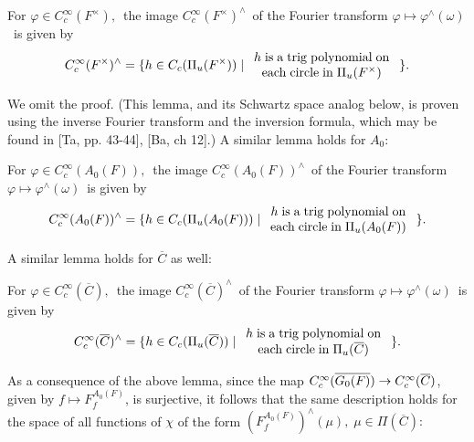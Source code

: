 \begin{lemma}
For $\varphi \in C_c^\infty (F^{\times }),$\ the image $C_c^\infty
(F^{\times })^{\wedge }$\ of the Fourier transform $\varphi \longmapsto
\varphi ^{\wedge }(\omega )$\ is given by 
\[
C_c^\infty (F^{\times })^{\wedge }=\{h\in C_c(\Pi _u(F^{\times }))\;|\;
\begin{array}{c}
h\;{\rm is\;a\;trig\;polynomial\;on} \\ 
{\rm each\;circle\;in}\;\Pi _u(F^{\times })
\end{array}
\;\}.
\]
\end{lemma}

We omit the proof. (This lemma, and its Schwartz space analog below, is
proven using the inverse Fourier transform and the inversion formula, which
may be found in [Ta, pp. 43-44], [Ba, ch 12].) A similar lemma holds for $%
A_0:$

\begin{lemma}
For $\varphi \in C_c^\infty (A_0(F)),$\ the image $C_c^\infty
(A_0(F))^{\wedge }$\ of the Fourier transform $\varphi \longmapsto \varphi
^{\wedge }(\omega )$\ is given by 
\[
C_c^\infty (A_0(F))^{\wedge }=\{h\in C_c(\Pi _u(A_0(F)))\;|\;
\begin{array}{c}
h\;{\rm is\;a\;trig\;polynomial\;on} \\ 
{\rm each\;circle\;in}\;\Pi _u(A_0(F))
\end{array}
\;\}.
\]
\end{lemma}

A similar lemma holds for $\overline{C}$ as well:

\begin{lemma}
For $\varphi \in C_c^\infty (\overline{C}),$\ the image $C_c^\infty (%
\overline{C})^{\wedge }$\ of the Fourier transform $\varphi \longmapsto
\varphi ^{\wedge }(\omega )$\ is given by 
\[
C_c^\infty (\overline{C})^{\wedge }=\{h\in C_c(\Pi _u(\overline{C}))\;|\;
\begin{array}{c}
h\;{\rm is\;a\;trig\;polynomial\;on} \\ 
{\rm each\;circle\;in}\;\Pi _u(\overline{C})
\end{array}
\;\}.
\]
\end{lemma}

As a consequence of the above lemma, since the map $C_c^\infty (\overline{%
G_0(F)})\rightarrow C_c^\infty (\overline{C})$, given by $f\longmapsto
F_f^{A_0(F)}$, is surjective, it follows that the same description holds for
the space of all functions of $\chi $ of the form $(F_f^{A_0(F)})^{\wedge
}(\mu ),\;\mu \in \Pi (\overline{C}):$

